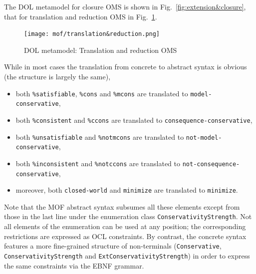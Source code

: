 \documentclass[10pt, a4paper]{isov2}
\makeatletter
\newcommand*\CommentAuthor{}
\renewcommand*\CommentAuthor{#1}}
\newcommand*\CommentDate{}
\renewcommand*\CommentDate{#1}}
\newcommand*\CommentId{}
\renewcommand*\CommentId{#1}}
\newcommand*\CommentType{}
\renewcommand*\CommentType{#1}}
\newcommand*{\SetCommentColorByType}[1]{%
\edef\localType{{#1}}%
\expandafter\ifstrequal\localType{q-aut}{\colorlet{CommentColor}{red}}{%
\expandafter\ifstrequal\localType{q-all}{\colorlet{CommentColor}{orange}}{%
\expandafter\ifstrequal\localType{todo}{\colorlet{CommentColor}{orange}}{%
\expandafter\ifstrequal\localType{fyi}{\colorlet{CommentColor}{lightgray}}{%
\colorlet{CommentColor}{yellow}}}}}}
\newcommand*{\SetCommentPrefixByType}[1]{%
\edef\localType{{#1}}%
\expandafter\@ifmtarg\localType{%
\edef\CommentPrefix{}%
}{%
\caseupper[q]{#1}%
\edef\CommentPrefix{\thestring: }%
}}
\newcommand*{\initComment}[1]{%
\setkeys{Comment}{#1}%
\SetCommentColorByType{\CommentType}%
\relax%
\SetCommentPrefixByType{\CommentType}%
\relax%
}
\newcommand*{\todonote}[2][]{%
\initComment{#1}%
\pdfcomment[author=\CommentAuthor,color=CommentColor,date=\CommentDate,id=\CommentId]{%
\CommentPrefix
#2}}
\renewcommand*{\todonote}[2][]{%
\initComment{#1}%
\ednote{\CommentPrefix #2}}
\newcommand*{\CLnote}[2][author=Christoph Lange]{%
\todonote[author=Christoph Lange,#1]{#2}}
\newcommand*{\syntax}[1]{\texttt{#1}}
\makeatother
\begin{document}
The DOL metamodel for closure OMS is shown in
Fig.~\ref{fig:extension&closure}, that for translation and reduction
OMS in Fig.~\ref{fig:translations&reduction}. 



\medskip
\begin{figure}
  \centering
    \texttt{[image: mof/translation\&reduction.png]}
  \caption{DOL metamodel: Translation and reduction OMS}
  \label{fig:translations&reduction}
\end{figure}



 \label{a:dol-text:OMS}


While in most cases the translation from concrete to abstract syntax
is obvious (the structure is largely the same),  
\begin{itemize}
\item both \syntax{\%satisfiable}, \syntax{\%cons} and \syntax{\%mcons} are translated
  to \syntax{model-conservative},
\item both \syntax{\%consistent}  and \syntax{\%ccons} are translated
  to \syntax{consequence-conservative},
\item  both   \syntax{\%unsatisfiable} and \syntax{\%notmcons} are translated to
  \syntax{not-model-conservative},
\item both \syntax{\%inconsistent}  and \syntax{\%notccons} are translated
  to \syntax{not-consequence-conservative},
\item moreover, both \syntax{closed-world} and \syntax{minimize} are
  translated to \syntax{minimize}.
\end{itemize}
Note that the MOF abstract syntax subsumes all these elements except
from those in the last line under the enumeration class
\syntax{ConservativityStrength}. Not all elements of the enumeration
can be used at any position; the corresponding restrictions are
expressed as OCL constraints.  By contrast, the concrete syntax
features a more fine-grained structure of non-terminals
(\syntax{Conservative}, \syntax{ConservativityStrength} and
\syntax{ExtConservativityStrength}) in order to express the same
constraints via the EBNF grammar.
                       
\end{document}
